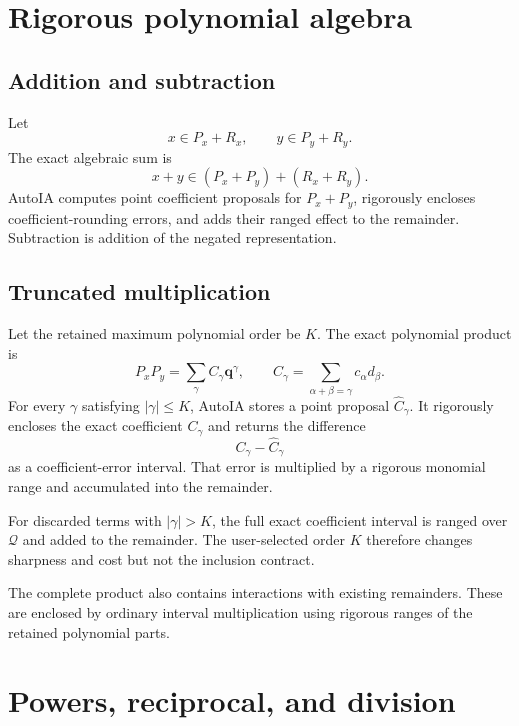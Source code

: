 \documentclass[11pt]{article}
\newcommand{\Qdom}{\mathcal{Q}}
\newcommand{\qv}{\mathbf{q}}
\begin{document}
\section{Rigorous polynomial algebra}

\subsection{Addition and subtraction}

Let
\[
  x\in P_x+R_x,
  \qquad
  y\in P_y+R_y.
\]
The exact algebraic sum is
\[
  x+y\in(P_x+P_y)+(R_x+R_y).
\]
AutoIA computes point coefficient proposals for \(P_x+P_y\), rigorously encloses
coefficient-rounding errors, and adds their ranged effect to the remainder.
Subtraction is addition of the negated representation.

\subsection{Truncated multiplication}

Let the retained maximum polynomial order be \(K\).  The exact polynomial
product is
\[
  P_xP_y
  =\sum_\gamma C_\gamma\qv^\gamma,
  \qquad
  C_\gamma=\sum_{\alpha+\beta=\gamma}c_\alpha d_\beta.
\]
For every \(\gamma\) satisfying \(|\gamma|\le K\), AutoIA stores a point proposal
\(\widehat C_\gamma\).  It rigorously encloses the exact coefficient
\(C_\gamma\) and returns the difference
\[
  C_\gamma-\widehat C_\gamma
\]
as a coefficient-error interval.  That error is multiplied by a rigorous
monomial range and accumulated into the remainder.

For discarded terms with \(|\gamma|>K\), the full exact coefficient interval is
ranged over \(\Qdom\) and added to the remainder.  The user-selected order \(K\)
therefore changes sharpness and cost but not the inclusion contract.

The complete product also contains interactions with existing remainders.  These
are enclosed by ordinary interval multiplication using rigorous ranges of the
retained polynomial parts.

\section{Powers, reciprocal, and division}
\end{document}
